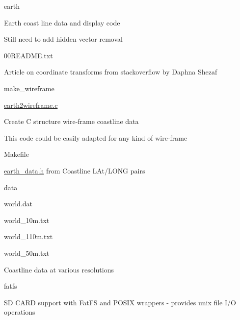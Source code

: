 \begin{DoxyItemize}
\item earth
\begin{DoxyItemize}
\item Earth coast line data and display code
\item Still need to add hidden vector removal
\begin{DoxyItemize}
\item 00\-R\-E\-A\-D\-M\-E.\-txt
\begin{DoxyItemize}
\item Article on coordinate transforms from stackoverflow by Daphna Shezaf
\end{DoxyItemize}
\item make\-\_\-wireframe
\begin{DoxyItemize}
\item \hyperlink{earth2wireframe_8c}{earth2wireframe.\-c}
\begin{DoxyItemize}
\item Create C structure wire-\/frame coastline data
\item This code could be easily adapted for any kind of wire-\/frame
\end{DoxyItemize}
\item Makefile
\begin{DoxyItemize}
\item \hyperlink{earth__data_8h}{earth\-\_\-data.\-h} from Coastline L\-At/\-L\-O\-N\-G pairs
\end{DoxyItemize}
\item data
\begin{DoxyItemize}
\item world.\-dat
\item world\-\_\-10m.\-txt
\item world\-\_\-110m.\-txt
\item world\-\_\-50m.\-txt
\begin{DoxyItemize}
\item Coastline data at various resolutions
\end{DoxyItemize}
\end{DoxyItemize}
\end{DoxyItemize}
\end{DoxyItemize}
\end{DoxyItemize}
\item fatfs
\begin{DoxyItemize}
\item S\-D C\-A\-R\-D support with Fat\-F\-S and P\-O\-S\-I\-X wrappers -\/ provides unix file I/\-O operations

\end{DoxyItemize}
\end{DoxyItemize}
